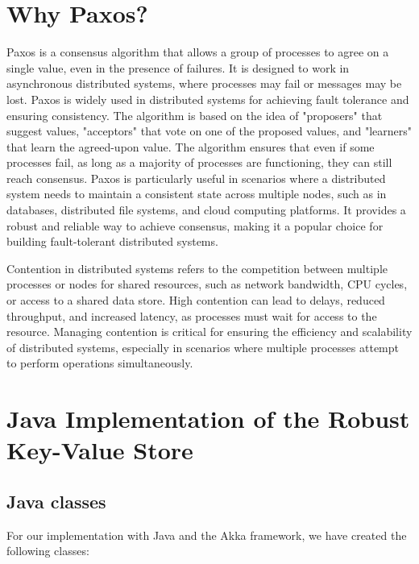 \documentclass{article}
\begin{document}


\tableofcontents
\listoffigures

\newpage

\section{Why Paxos?}
Paxos is a consensus algorithm that allows a group of processes to agree on a single value, even in the presence of failures. It is designed to work in asynchronous distributed systems, where processes may fail or messages may be lost. Paxos is widely used in distributed systems for achieving fault tolerance and ensuring consistency.
The algorithm is based on the idea of "proposers" that suggest values, "acceptors" that vote on one of the proposed values, and "learners" that learn the agreed-upon value. The algorithm ensures that even if some processes fail, as long as a majority of processes are functioning, they can still reach consensus.
Paxos is particularly useful in scenarios where a distributed system needs to maintain a consistent state across multiple nodes, such as in databases, distributed file systems, and cloud computing platforms. It provides a robust and reliable way to achieve consensus, making it a popular choice for building fault-tolerant distributed systems.

Contention in distributed systems refers to the competition between multiple processes or nodes for shared resources, such as network bandwidth, CPU cycles, or access to a shared data store. High contention can lead to delays, reduced throughput, and increased latency, as processes must wait for access to the resource. Managing contention is critical for ensuring the efficiency and scalability of distributed systems, especially in scenarios where multiple processes attempt to perform operations simultaneously.

\section{Java Implementation of the Robust Key-Value Store}

\subsection{Java classes}
For our implementation with Java and the Akka framework, we have created the following classes:
\end{document}
